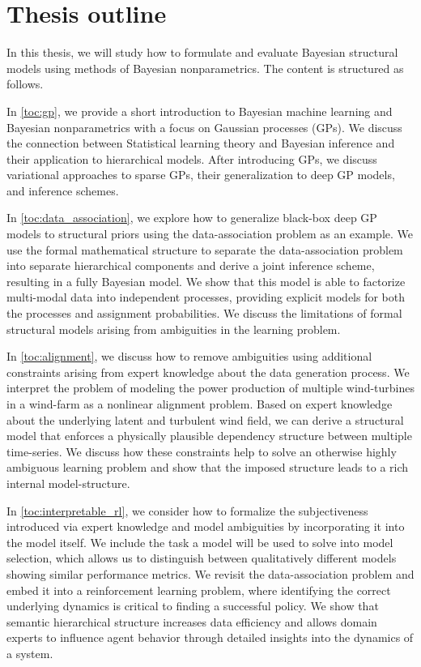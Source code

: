 \section{Thesis outline}
In this thesis, we will study how to formulate and evaluate Bayesian structural models using methods of Bayesian nonparametrics.
The content is structured as follows.

In \cref{toc:gp}, we provide a short introduction to Bayesian machine learning and Bayesian nonparametrics with a focus on Gaussian processes (GPs).
We discuss the connection between Statistical learning theory and Bayesian inference and their application to hierarchical models.
After introducing GPs, we discuss variational approaches to sparse GPs, their generalization to deep GP models, and inference schemes.

In \cref{toc:data_association}, we explore how to generalize black-box deep GP models to structural priors using the data-association problem as an example.
We use the formal mathematical structure to separate the data-association problem into separate hierarchical components and derive a joint inference scheme, resulting in a fully Bayesian model.
We show that this model is able to factorize multi-modal data into independent processes, providing explicit models for both the processes and assignment probabilities.
We discuss the limitations of formal structural models arising from ambiguities in the learning problem.

In \cref{toc:alignment}, we discuss how to remove ambiguities using additional constraints arising from expert knowledge about the data generation process.
We interpret the problem of modeling the power production of multiple wind-turbines in a wind-farm as a nonlinear alignment problem.
Based on expert knowledge about the underlying latent and turbulent wind field, we can derive a structural model that enforces a physically plausible dependency structure between multiple time-series.
We discuss how these constraints help to solve an otherwise highly ambiguous learning problem and show that the imposed structure leads to a rich internal model-structure.

In \cref{toc:interpretable_rl}, we consider how to formalize the subjectiveness introduced via expert knowledge and model ambiguities by incorporating it into the model itself.
We include the task a model will be used to solve into model selection, which allows us to distinguish between qualitatively different models showing similar performance metrics.
We revisit the data-association problem and embed it into a reinforcement learning problem, where identifying the correct underlying dynamics is critical to finding a successful policy.
We show that semantic hierarchical structure increases data efficiency and allows domain experts to influence agent behavior through detailed insights into the dynamics of a system.

